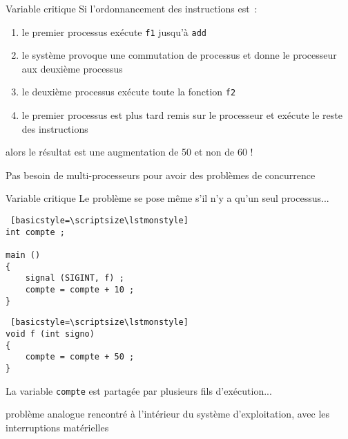 \begin {frame} {Variable critique}
    Si l'ordonnancement des instructions est~:

    \begin {enumerate}
	\item le premier processus exécute \texttt {f1} jusqu'à \texttt {add}
	\item le système provoque une commutation de processus et donne le
	    processeur aux deuxième processus
	\item le deuxième processus exécute toute la fonction \texttt {f2}
	\item le premier processus est plus tard remis sur le processeur
	    et exécute le reste des instructions
    \end {enumerate}
    \implique alors le résultat est une augmentation de 50 et non de 60 !

    \vspace* {5mm}

    Pas besoin de multi-processeurs pour avoir des problèmes de
    concurrence

\end {frame}

\begin {frame} [fragile] {Variable critique}
    Le problème se pose même s'il n'y a qu'un seul processus...

\begin {minipage} {.45\textwidth}
\begin {lstlisting} [basicstyle=\scriptsize\lstmonstyle]
int compte ;

main ()
{
    signal (SIGINT, f) ;
    compte = compte + 10 ;
}
\end{lstlisting}
\end {minipage}
\hfill
\begin {minipage} {.45\textwidth}
\begin {lstlisting} [basicstyle=\scriptsize\lstmonstyle]
void f (int signo)
{
    compte = compte + 50 ;
}
\end{lstlisting}
\end {minipage}

    La variable \texttt {compte} est partagée par plusieurs fils
    d'exécution...

    \vspace* {7mm}

    \implique problème analogue rencontré à l'intérieur du système
    d'exploitation, avec les interruptions matérielles

\end{frame}


